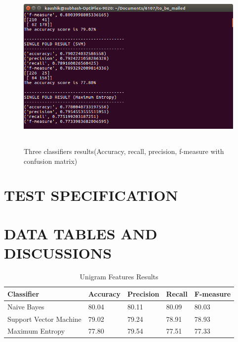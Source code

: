 \documentclass[oneside,a4paper,12pt]{pictreport}
\begin{document}
\begin{figure}[!h]
\includegraphics[width=5.5in,height=3.3in]{screenshot5.png}
\caption{Three classifiers results(Accuracy, recall, precision, f-measure with confusion matrix)}
\end{figure}



\chapter{TEST SPECIFICATION}

\chapter{DATA TABLES AND DISCUSSIONS} 


\begin{table}[h!]
\centering
\caption{Unigram Features Results}
\label{my-label}
\begin{tabular}{|l|l|l|l|l|}
\hline
\textbf{Classifier} & \textbf{Accuracy} & \textbf{Precision} & \textbf{Recall} & \textbf{F-measure}\\ \hline
Naive Bayes          & 80.04  & 80.11 & 80.09 & 80.03                   \\ \hline
Support Vector Machine          & 79.02  & 79.24 & 78.91 & 78.93                   \\ \hline
Maximum Entropy          & 77.80  & 79.54 & 77.51 & 77.33 \\ \hline
\end{tabular}
\end{table}
\end{document}
